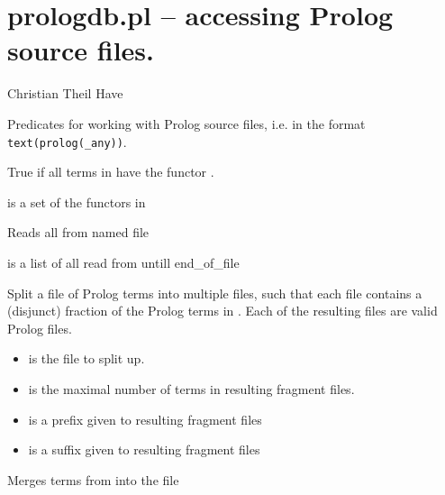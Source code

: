 


\section{prologdb.pl -- accessing Prolog source files.}

\label{sec:prologdb}

\begin{tags}
Christian Theil Have
\end{tags}

Predicates for working with Prolog source files, i.e. in the format \verb$text(prolog(_any))$.\vspace{0.7cm}

\begin{description}
True if all terms in  have the functor .

 is a set of the functors in 

Reads all  from named file 

 is a list of all  read from  untill end_of_file

Split a file of Prolog terms into multiple files, such that each file contains
a (disjunct) fraction of the Prolog terms in . Each of the resulting files
are valid Prolog files.

\begin{itemize}
    \item {} is the file to split up.
    \item {} is the maximal number of terms in resulting fragment files.
    \item {} is a prefix given to resulting fragment files
    \item {} is a suffix given to resulting fragment files
\end{itemize}

Merges terms from  into the file 
\end{description}

